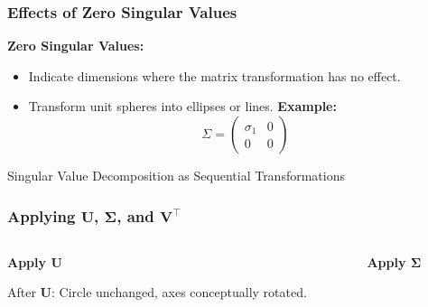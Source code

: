 \documentclass[aspectratio=169]{beamer}
\begin{document}
\begin{frame}
\frametitle{Effects of Zero Singular Values}
\textbf{Zero Singular Values:}
\begin{itemize}
    \item<2-> Indicate dimensions where the matrix transformation has no effect.
    \item<3-> Transform unit spheres into ellipses or lines.
\textbf{Example:}
\[
\Sigma = \begin{pmatrix}
\sigma_1 & 0 \\
0  & 0
\end{pmatrix}
\]
\end{itemize}

\end{frame}

\begin{frame}{Singular Value Decomposition as Sequential Transformations}
  \frametitle{Applying \( \mathbf{U} \), \( \mathbf{\Sigma} \), and \( \mathbf{V}^\top \)}
\pause
  \begin{columns}
    \begin{column}{0.3\textwidth}
      \centering
      \textbf{Apply \( \mathbf{U} \)}\\[0.5cm]
      
      
      {\footnotesize After \( \mathbf{U} \): Circle unchanged, axes conceptually rotated.}
    \end{column} \pause
    
    \begin{column}{0.3\textwidth}
      \centering
      \textbf{Apply \( \mathbf{\Sigma} \)}\\[0.5cm]
      

\end{column}
\end{columns}
\end{frame}
\end{document}
